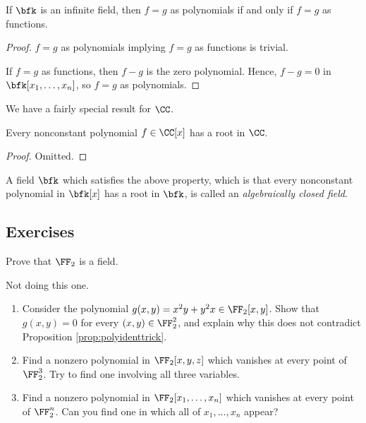 \documentclass{article}
\begin{document}
\begin{corollary}
    If $\bfk$ is an infinite field, then $f=g$ as polynomials if and only if $f=g$ as functions.
\end{corollary}

\begin{proof}
    $f=g$ as polynomials implying $f=g$ as functions is trivial.

    If $f=g$ as functions, then $f-g$ is the zero polynomial.
    Hence, $f-g=0$ in $\bfk[x_1,\ldots,x_n]$, so $f=g$ as polynomials.
\end{proof}

We have a fairly special result for $\CC$.
\begin{theorem}
    Every nonconstant polynomial $f \in \CC[x]$ has a root in $\CC$.
\end{theorem}

\begin{proof}
    Omitted.
\end{proof}

A field $\bfk$ which satisfies the above property, which is that every nonconstant polynomial in $\bfk[x]$ has a root in $\bfk$, is called an \textit{algebraically closed field}.

\subsection{Exercises}

\begin{exercise}
    Prove that $\FF_2$ is a field.
\end{exercise}

Not doing this one.

\begin{exercise}
    \begin{enumerate}[label=(\alph*)]
        \item 
            Consider the polynomial $g(x,y) = x^2y + y^2x \in \FF_2[x,y]$.
            Show that $g(x,y)=0$ for every $(x,y) \in \FF_2^2$, and explain why this does not contradict Proposition \ref{prop:polyidenttrick}.
        \item
            Find a nonzero polynomial in $\FF_2[x,y,z]$ which vanishes at every point of $\FF_2^3$.
            Try to find one involving all three variables.
        \item
            Find a nonzero polynomial in $\FF_2[x_1,\ldots,x_n]$ which vanishes at every point of $\FF_2^n$.
            Can you find one in which all of $x_1,\ldots,x_n$ appear?
    \end{enumerate}
\end{exercise}
\end{document}
